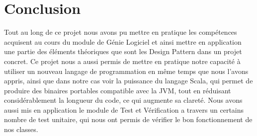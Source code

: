 \documentclass[french]{article}
\begin{document}
\section{Conclusion}
Tout au long de ce projet nous avons pu mettre en pratique les compétences acquisent au cours du module de Génie Logiciel et ainsi mettre en application une partie des éléments théoriques que sont les Design Pattern dans un projet concret. Ce projet nous a aussi permis de mettre en pratique notre capacité à utiliser un nouveau langage de programmation en même temps que nous l'avons appris, ainsi que dans notre cas voir la puissance du langage Scala, qui permet de produire des binaires portables compatible avec la JVM, tout en réduisant considérablement la longueur du code, ce qui augmente sa clareté. Nous avons aussi mis en application le module de Test et Vérification a travers un certains nombre de test unitaire, qui nous ont permis de vérifier le bon fonctionnement de nos classes.


\end{document}

